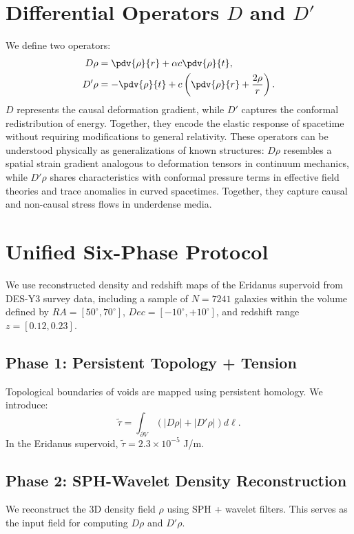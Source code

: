\documentclass[twocolumn]{aastex631}
\begin{document}
\section{Differential Operators $D$ and $D'$}
We define two operators:
\begin{align}
    D\rho &= \pdv{\rho}{r} + \alpha c \pdv{\rho}{t}, \\
    D'\rho &= -\pdv{\rho}{t} + c \left( \pdv{\rho}{r} + \frac{2\rho}{r} \right).
\end{align}
$D$ represents the causal deformation gradient, while $D'$ captures the conformal redistribution of energy. Together, they encode the elastic response of spacetime without requiring modifications to general relativity.
These operators can be understood physically as generalizations of known structures: \(D\rho\) resembles a spatial strain gradient analogous to deformation tensors in continuum mechanics, while \(D'\rho\) shares characteristics with conformal pressure terms in effective field theories and trace anomalies in curved spacetimes. Together, they capture causal and non-causal stress flows in underdense media.

\section{Unified Six-Phase Protocol}
We use reconstructed density and redshift maps of the Eridanus supervoid from DES-Y3 survey data, including a sample of \(N = 7241\) galaxies within the volume defined by \(RA = [50^\circ, 70^\circ]\), \(Dec = [-10^\circ, +10^\circ]\), and redshift range \(z = [0.12, 0.23]\).

\subsection{Phase 1: Persistent Topology + Tension}
Topological boundaries of voids are mapped using persistent homology. We introduce:
\begin{equation}
    \tilde{\tau} = \int_{\partial V} \left( |D\rho| + |D'\rho| \right) d\ell.
\end{equation}
In the Eridanus supervoid, $\tilde{\tau} = 2.3 \times 10^{-5}$ J/m.

\subsection{Phase 2: SPH-Wavelet Density Reconstruction}
We reconstruct the 3D density field $\rho$ using SPH + wavelet filters. This serves as the input field for computing $D\rho$ and $D'\rho$.
\end{document}
